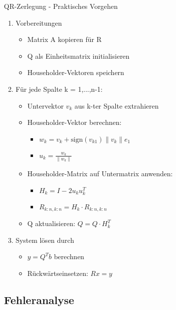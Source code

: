 \begin{KR}{QR-Zerlegung - Praktisches Vorgehen}
\begin{enumerate}
    \item Vorbereitungen
    \begin{itemize}
        \item Matrix A kopieren für R
        \item Q als Einheitsmatrix initialisieren
        \item Householder-Vektoren speichern
    \end{itemize}

    \item Für jede Spalte k = 1,...,n-1:
    \begin{itemize}
        \item Untervektor $v_k$ aus k-ter Spalte extrahieren
        \item Householder-Vektor berechnen:
            \begin{itemize}
                \item $w_k = v_k + \text{sign}(v_{k1})\|v_k\|e_1$
                \item $u_k = \frac{w_k}{\|w_k\|}$
            \end{itemize}
        \item Householder-Matrix auf Untermatrix anwenden:
            \begin{itemize}
                \item $H_k = I - 2u_ku_k^T$
                \item $R_{k:n,k:n} = H_k \cdot R_{k:n,k:n}$
            \end{itemize}
        \item Q aktualisieren: $Q = Q \cdot H_k^T$
    \end{itemize}

    \item System lösen durch
    \begin{itemize}
        \item $y = Q^Tb$ berechnen
        \item Rückwärtseinsetzen: $Rx = y$
    \end{itemize}
\end{enumerate}
\end{KR}




\subsection{Fehleranalyse}

